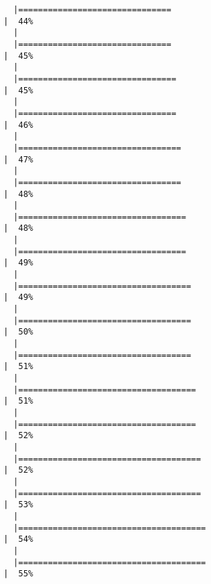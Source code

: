 \documentclass[
  letterpaper,
]{book}
\begin{document}
\begin{verbatim}
  |===============================                                       |  44%
  |                                                                            
  |===============================                                       |  45%
  |                                                                            
  |================================                                      |  45%
  |                                                                            
  |================================                                      |  46%
  |                                                                            
  |=================================                                     |  47%
  |                                                                            
  |=================================                                     |  48%
  |                                                                            
  |==================================                                    |  48%
  |                                                                            
  |==================================                                    |  49%
  |                                                                            
  |===================================                                   |  49%
  |                                                                            
  |===================================                                   |  50%
  |                                                                            
  |===================================                                   |  51%
  |                                                                            
  |====================================                                  |  51%
  |                                                                            
  |====================================                                  |  52%
  |                                                                            
  |=====================================                                 |  52%
  |                                                                            
  |=====================================                                 |  53%
  |                                                                            
  |======================================                                |  54%
  |                                                                            
  |======================================                                |  55%

\end{verbatim}
\end{document}
